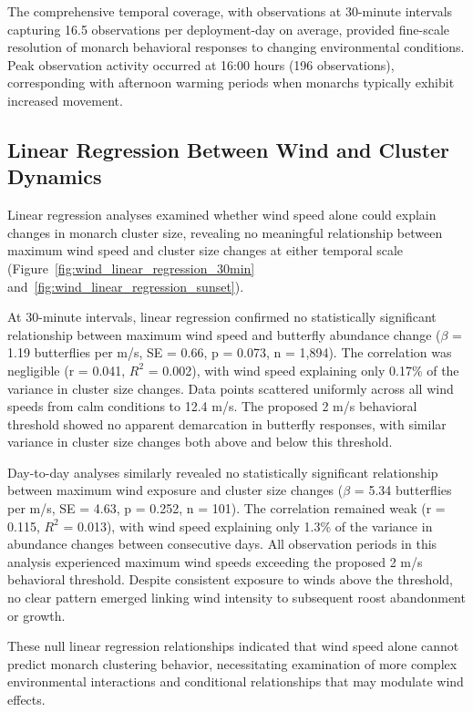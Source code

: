 The comprehensive temporal coverage, with observations at 30-minute intervals capturing 16.5 observations per deployment-day on average, provided fine-scale resolution of monarch behavioral responses to changing environmental conditions. Peak observation activity occurred at 16:00 hours (196 observations), corresponding with afternoon warming periods when monarchs typically exhibit increased movement.

\subsection{Linear Regression Between Wind and Cluster Dynamics}

Linear regression analyses examined whether wind speed alone could explain changes in monarch cluster size, revealing no meaningful relationship between maximum wind speed and cluster size changes at either temporal scale (Figure~\ref{fig:wind_linear_regression_30min} and~\ref{fig:wind_linear_regression_sunset}).

At 30-minute intervals, linear regression confirmed no statistically significant relationship between maximum wind speed and butterfly abundance change ($\beta$ = 1.19 butterflies per m/s, SE = 0.66, p = 0.073, n = 1,894). The correlation was negligible (r = 0.041, $R^2$ = 0.002), with wind speed explaining only 0.17\% of the variance in cluster size changes. Data points scattered uniformly across all wind speeds from calm conditions to 12.4 m/s. The proposed 2 m/s behavioral threshold showed no apparent demarcation in butterfly responses, with similar variance in cluster size changes both above and below this threshold.

Day-to-day analyses similarly revealed no statistically significant relationship between maximum wind exposure and cluster size changes ($\beta$ = 5.34 butterflies per m/s, SE = 4.63, p = 0.252, n = 101). The correlation remained weak (r = 0.115, $R^2$ = 0.013), with wind speed explaining only 1.3\% of the variance in abundance changes between consecutive days. All observation periods in this analysis experienced maximum wind speeds exceeding the proposed 2 m/s behavioral threshold. Despite consistent exposure to winds above the threshold, no clear pattern emerged linking wind intensity to subsequent roost abandonment or growth.

These null linear regression relationships indicated that wind speed alone cannot predict monarch clustering behavior, necessitating examination of more complex environmental interactions and conditional relationships that may modulate wind effects.

